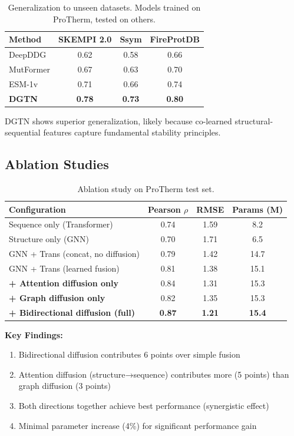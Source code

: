 \documentclass[12pt,en]{elegantpaper}
\begin{document}
\begin{table}[htbp]
\centering
\caption{Generalization to unseen datasets. Models trained on ProTherm, tested on others.}
\label{tab:generalization}
\begin{tabular}{lccc}
\toprule
\textbf{Method} & \textbf{SKEMPI 2.0} & \textbf{Ssym} & \textbf{FireProtDB} \\
\midrule
DeepDDG & 0.62 & 0.58 & 0.66 \\
MutFormer & 0.67 & 0.63 & 0.70 \\
ESM-1v & 0.71 & 0.66 & 0.74 \\
\textbf{DGTN} & \textbf{0.78} & \textbf{0.73} & \textbf{0.80} \\
\bottomrule
\end{tabular}
\end{table}

DGTN shows superior generalization, likely because co-learned structural-sequential features capture fundamental stability principles.

\subsection{Ablation Studies}

\begin{table}[htbp]
\centering
\caption{Ablation study on ProTherm test set.}
\label{tab:ablation}
\begin{tabular}{lccc}
\toprule
\textbf{Configuration} & \textbf{Pearson} $\rho$ & \textbf{RMSE} & \textbf{Params (M)} \\
\midrule
Sequence only (Transformer) & 0.74 & 1.59 & 8.2 \\
Structure only (GNN) & 0.70 & 1.71 & 6.5 \\
GNN + Trans (concat, no diffusion) & 0.79 & 1.42 & 14.7 \\
GNN + Trans (learned fusion) & 0.81 & 1.38 & 15.1 \\
\midrule
\textbf{+ Attention diffusion only} & 0.84 & 1.31 & 15.3 \\
\textbf{+ Graph diffusion only} & 0.82 & 1.35 & 15.3 \\
\textbf{+ Bidirectional diffusion (full)} & \textbf{0.87} & \textbf{1.21} & \textbf{15.4} \\
\bottomrule
\end{tabular}
\end{table}

\textbf{Key Findings:}
\begin{enumerate}
    \item Bidirectional diffusion contributes 6 points over simple fusion
    \item Attention diffusion (structure→sequence) contributes more (5 points) than graph diffusion (3 points)
    \item Both directions together achieve best performance (synergistic effect)
    \item Minimal parameter increase (4\%) for significant performance gain
\end{enumerate}
\end{document}
